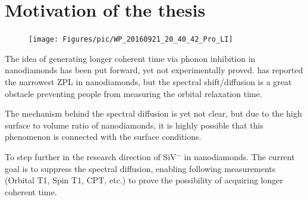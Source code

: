 
\section[Motivation of the thesis]{Motivation of the thesis}
\FloatBarrier
\begin{figure}[h]
	\centering
	\texttt{[image: Figures/pic/WP\_20160921\_20\_40\_42\_Pro\_LI]}
	\caption{}
	\label{fig:wp20160921204042proli}
\end{figure}
\FloatBarrier

The idea of generating longer coherent time via phonon inhibition in nanodiamonds has been put forward, yet not experimentally proved.
\citep{jantzen_nanodiamonds_2016} has reported the narrowest ZPL in nanodiamonds, but the spectral shift/diffusion is a great obstacle preventing people from measuring the orbital relaxation time. 

The mechanism behind the spectral diffusion is yet not clear, but due to the high surface to volume ratio of nanodiamonds, it is highly possible that this phenomenon is connected with the surface conditions. \citep{jantzen_nanodiamonds_2016}

To step further in the research direction of SiV$^{-}$ in nanodiamonds. The current goal is to suppress the spectral diffusion, enabling following measurements (Orbital T1, Spin T1, CPT, etc.) to prove the possibility of acquiring longer coherent time.
